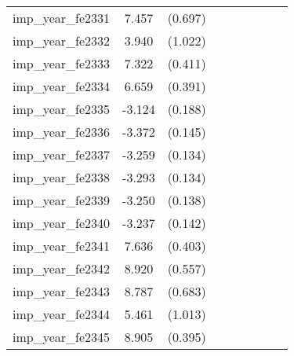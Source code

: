 {\begin{tabular}{l*{4}{cc}}
imp\_year\_fe2331&    7.457\sym{***}&  (0.697)&                  &         &                  &         &                  &         \\
imp\_year\_fe2332&    3.940\sym{***}&  (1.022)&                  &         &                  &         &                  &         \\
imp\_year\_fe2333&    7.322\sym{***}&  (0.411)&                  &         &                  &         &                  &         \\
imp\_year\_fe2334&    6.659\sym{***}&  (0.391)&                  &         &                  &         &                  &         \\
imp\_year\_fe2335&   -3.124\sym{***}&  (0.188)&                  &         &                  &         &                  &         \\
imp\_year\_fe2336&   -3.372\sym{***}&  (0.145)&                  &         &                  &         &                  &         \\
imp\_year\_fe2337&   -3.259\sym{***}&  (0.134)&                  &         &                  &         &                  &         \\
imp\_year\_fe2338&   -3.293\sym{***}&  (0.134)&                  &         &                  &         &                  &         \\
imp\_year\_fe2339&   -3.250\sym{***}&  (0.138)&                  &         &                  &         &                  &         \\
imp\_year\_fe2340&   -3.237\sym{***}&  (0.142)&                  &         &                  &         &                  &         \\
imp\_year\_fe2341&    7.636\sym{***}&  (0.403)&                  &         &                  &         &                  &         \\
imp\_year\_fe2342&    8.920\sym{***}&  (0.557)&                  &         &                  &         &                  &         \\
imp\_year\_fe2343&    8.787\sym{***}&  (0.683)&                  &         &                  &         &                  &         \\
imp\_year\_fe2344&    5.461\sym{***}&  (1.013)&                  &         &                  &         &                  &         \\
imp\_year\_fe2345&    8.905\sym{***}&  (0.395)&                  &         &                  &         &                  &         \\

\end{tabular}}
